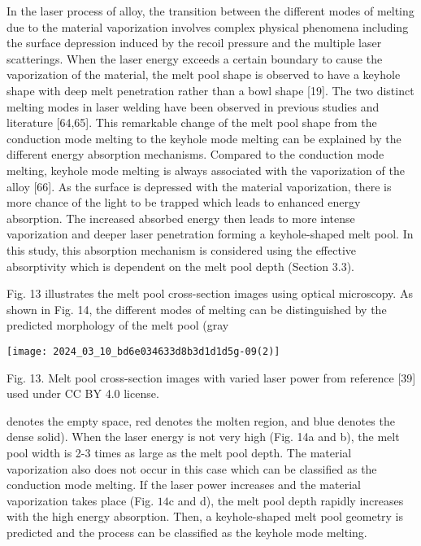 \documentclass[10pt]{article}
\begin{document}
In the laser process of alloy, the transition between the different modes of melting due to the material vaporization involves complex physical phenomena including the surface depression induced by the recoil pressure and the multiple laser scatterings. When the laser energy exceeds a certain boundary to cause the vaporization of the material, the melt pool shape is observed to have a keyhole shape with deep melt penetration rather than a bowl shape [19]. The two distinct melting modes in laser welding have been observed in previous studies and literature [64,65]. This remarkable change of the melt pool shape from the conduction mode melting to the keyhole mode melting can be explained by the different energy absorption mechanisms. Compared to the conduction mode melting, keyhole mode melting is always associated with the vaporization of the alloy [66]. As the surface is depressed with the material vaporization, there is more chance of the light to be trapped which leads to enhanced energy absorption. The increased absorbed energy then leads to more intense vaporization and deeper laser penetration forming a keyhole-shaped melt pool. In this study, this absorption mechanism is considered using the effective absorptivity which is dependent on the melt pool depth (Section 3.3).

Fig. 13 illustrates the melt pool cross-section images using optical microscopy. As shown in Fig. 14, the different modes of melting can be distinguished by the predicted morphology of the melt pool (gray

\begin{center}
\texttt{[image: 2024\_03\_10\_bd6e034633d8b3d1d1d5g-09(2)]}
\end{center}

Fig. 13. Melt pool cross-section images with varied laser power from reference [39] used under CC BY 4.0 license.

denotes the empty space, red denotes the molten region, and blue denotes the dense solid). When the laser energy is not very high (Fig. 14a and b), the melt pool width is 2-3 times as large as the melt pool depth. The material vaporization also does not occur in this case which can be classified as the conduction mode melting. If the laser power increases and the material vaporization takes place (Fig. $14 \mathrm{c}$ and d), the melt pool depth rapidly increases with the high energy absorption. Then, a keyhole-shaped melt pool geometry is predicted and the process can be classified as the keyhole mode melting.
\end{document}
